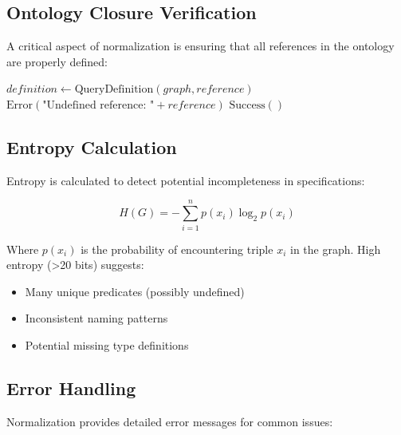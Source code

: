 \subsection{Ontology Closure Verification}

A critical aspect of normalization is ensuring that all references in the ontology are properly defined:

\begin{algorithm}
\caption{Closure Verification}
\begin{algorithmic}[1]
        \State $definition \gets \text{QueryDefinition}(graph, reference)$
            \State \Return $\text{Error}(\text{"Undefined reference: "} + reference)$
        \EndIf
    \EndFor
    \State \Return $\text{Success}()$
\EndProcedure
\end{algorithmic}
\end{algorithm}

\subsection{Entropy Calculation}

Entropy is calculated to detect potential incompleteness in specifications:

\begin{equation}
    H(G) = -\sum_{i=1}^{n} p(x_i) \log_2 p(x_i)
\end{equation}

Where \(p(x_i)\) is the probability of encountering triple \(x_i\) in the graph. High entropy (>20 bits) suggests:
\begin{itemize}
    \item Many unique predicates (possibly undefined)
    \item Inconsistent naming patterns
    \item Potential missing type definitions
\end{itemize}

\subsection{Error Handling}

Normalization provides detailed error messages for common issues:

